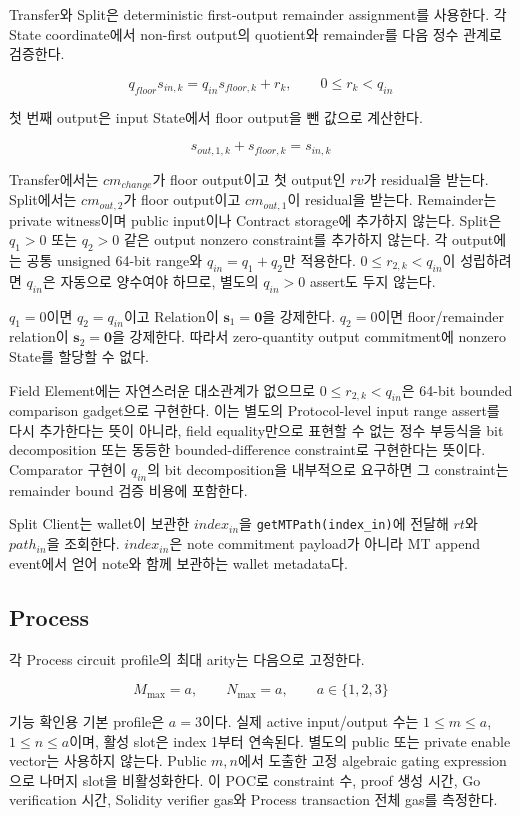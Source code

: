 \documentclass[11pt,a4paper]{extarticle}
\begin{document}
Transfer와 Split은 deterministic first-output remainder assignment를 사용한다.
각 State coordinate에서 non-first output의 quotient와 remainder를 다음 정수 관계로
검증한다.

\[
q_{floor}s_{in,k}=q_{in}s_{floor,k}+r_k,
\qquad
0\leq r_k<q_{in}
\]

첫 번째 output은 input State에서 floor output을 뺀 값으로 계산한다.

\[
s_{out,1,k}+s_{floor,k}=s_{in,k}
\]

Transfer에서는 $cm_{change}$가 floor output이고 첫 output인 $rv$가 residual을 받는다.
Split에서는 $cm_{out,2}$가 floor output이고 $cm_{out,1}$이 residual을 받는다.
Remainder는 private witness이며 public input이나 Contract storage에 추가하지 않는다.
Split은 $q_1>0$ 또는 $q_2>0$ 같은 output nonzero constraint를 추가하지 않는다.
각 output에는 공통 unsigned 64-bit range와 $q_{in}=q_1+q_2$만 적용한다.
$0\leq r_{2,k}<q_{in}$이 성립하려면 $q_{in}$은 자동으로 양수여야 하므로,
별도의 $q_{in}>0$ assert도 두지 않는다.

$q_1=0$이면 $q_2=q_{in}$이고 Relation이 $\mathbf{s}_1=\mathbf{0}$을 강제한다.
$q_2=0$이면 floor/remainder relation이 $\mathbf{s}_2=\mathbf{0}$을 강제한다.
따라서 zero-quantity output commitment에 nonzero State를 할당할 수 없다.

Field Element에는 자연스러운 대소관계가 없으므로 $0\leq r_{2,k}<q_{in}$은
64-bit bounded comparison gadget으로 구현한다. 이는 별도의 Protocol-level input
range assert를 다시 추가한다는 뜻이 아니라, field equality만으로 표현할 수 없는 정수
부등식을 bit decomposition 또는 동등한 bounded-difference constraint로 구현한다는 뜻이다.
Comparator 구현이 $q_{in}$의 bit decomposition을 내부적으로 요구하면 그 constraint는
remainder bound 검증 비용에 포함한다.

Split Client는 wallet이 보관한 $index_{in}$을 \texttt{getMTPath(index\_in)}에 전달해
$rt$와 $path_{in}$을 조회한다. $index_{in}$은 note commitment payload가 아니라 MT append
event에서 얻어 note와 함께 보관하는 wallet metadata다.

\subsection{Process}

각 Process circuit profile의 최대 arity는 다음으로 고정한다.

\[
M_{\max}=a,
\qquad
N_{\max}=a,
\qquad
a\in\{1,2,3\}
\]

기능 확인용 기본 profile은 $a=3$이다. 실제 active input/output 수는
$1\leq m\leq a$, $1\leq n\leq a$이며, 활성 slot은 index
1부터 연속된다. 별도의 public 또는 private enable vector는 사용하지 않는다. Public $m,n$에서
도출한 고정 algebraic gating expression으로 나머지 slot을 비활성화한다. 이 POC로
constraint 수, proof 생성 시간, Go verification 시간, Solidity verifier gas와 Process
transaction 전체 gas를 측정한다.
\end{document}

